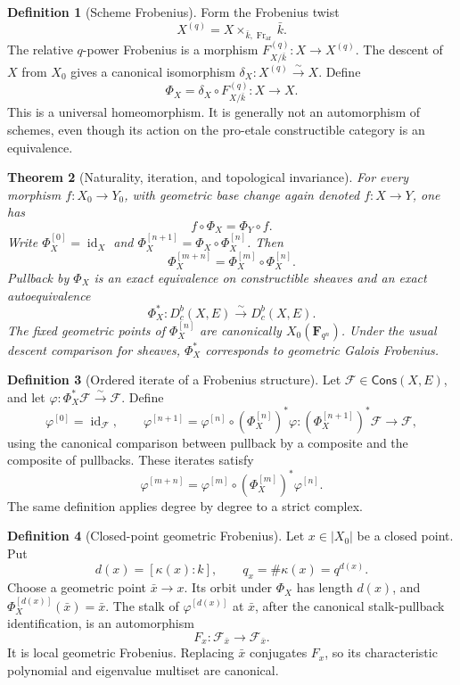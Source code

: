 \documentclass[10pt]{article}
\newtheorem{theorem}{Theorem}[section]
\theoremstyle{definition}
\newtheorem{definition}[theorem]{Definition}
\newcommand{\Dbc}{D^b_c}
\newcommand{\Fr}{\operatorname{Fr}}
\begin{document}
\begin{definition}[Scheme Frobenius]
Form the Frobenius twist
\[
              X^{(q)}=X\times_{\bar k,\Fr_{\mathrm{ar}}}\bar k.
\]
The relative \(q\)-power Frobenius is a morphism
\(F^{(q)}_{X/\bar k}:X\to X^{(q)}\).  The descent of \(X\) from \(X_0\)
gives a canonical isomorphism
\(\delta_X:X^{(q)}\xrightarrow{\sim}X\).  Define
\[
       \Phi_X=\delta_X\circ F^{(q)}_{X/\bar k}:X\longrightarrow X.
\]
This is a universal homeomorphism.  It is generally not an automorphism of
schemes, even though its action on the pro-etale constructible category is
an equivalence.
\end{definition}

\begin{theorem}[Naturality, iteration, and topological invariance]
For every morphism \(f:X_0\to Y_0\), with geometric base change again
denoted \(f:X\to Y\), one has
\[
                         f\circ\Phi_X=\Phi_Y\circ f.
\]
Write \(\Phi_X^{[0]}=\operatorname{id}_X\) and
\(\Phi_X^{[n+1]}=\Phi_X\circ\Phi_X^{[n]}\).  Then
\[
 \Phi_X^{[m+n]}=\Phi_X^{[m]}\circ\Phi_X^{[n]}.
\]
Pullback by \(\Phi_X\) is an exact equivalence on constructible sheaves and
an exact autoequivalence
\[
                  \Phi_X^*:\Dbc(X,E)\xrightarrow{\sim}\Dbc(X,E).
\]
The fixed geometric points of \(\Phi_X^{[n]}\) are canonically
\(X_0(\mathbf F_{q^n})\).  Under the usual descent comparison for sheaves,
\(\Phi_X^*\) corresponds to geometric Galois Frobenius.
\end{theorem}

\begin{definition}[Ordered iterate of a Frobenius structure]
Let \(\mathcal F\in\mathsf{Cons}(X,E)\), and let
\(\varphi:\Phi_X^*\mathcal F\xrightarrow{\sim}\mathcal F\).  Define
\[
 \varphi^{[0]}=\operatorname{id}_{\mathcal F},\qquad
 \varphi^{[n+1]}
  =\varphi^{[n]}\circ(\Phi_X^{[n]})^*\varphi:
  (\Phi_X^{[n+1]})^*\mathcal F\longrightarrow\mathcal F,
\]
using the canonical comparison between pullback by a composite and the
composite of pullbacks.  These iterates satisfy
\[
 \varphi^{[m+n]}
 =\varphi^{[m]}\circ(\Phi_X^{[m]})^*\varphi^{[n]}.
\]
The same definition applies degree by degree to a strict complex.
\end{definition}

\begin{definition}[Closed-point geometric Frobenius]
Let \(x\in|X_0|\) be a closed point.  Put
\[
 d(x)=[\kappa(x):k],\qquad q_x=\#\kappa(x)=q^{d(x)}.
\]
Choose a geometric point \(\bar x\to x\).  Its orbit under \(\Phi_X\) has
length \(d(x)\), and \(\Phi_X^{[d(x)]}(\bar x)=\bar x\).  The stalk of
\(\varphi^{[d(x)]}\) at \(\bar x\), after the canonical stalk-pullback
identification, is an automorphism
\[
              F_x:\mathcal F_{\bar x}\longrightarrow\mathcal F_{\bar x}.
\]
It is local geometric Frobenius.  Replacing \(\bar x\) conjugates \(F_x\),
so its characteristic polynomial and eigenvalue multiset are canonical.
\end{definition}
\end{document}
